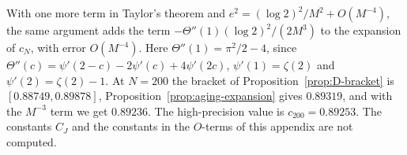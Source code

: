 With one more term in Taylor's theorem and $e^2=(\log2)^2/M^2+O(M^{-4})$, the
same argument adds the term $-\Theta''(1)(\log2)^2/(2M^3)$ to the expansion
of $c_N$, with error $O(M^{-4})$. Here $\Theta''(1)=\pi^2/2-4$, since
$\Theta''(c)=\psi'(2-c)-2\psi'(c)+4\psi'(2c)$, $\psi'(1)=\zeta(2)$ and
$\psi'(2)=\zeta(2)-1$. At $N=200$ the bracket of
Proposition~\ref{prop:D-bracket} is $[0.88749,0.89878]$,
Proposition~\ref{prop:aging-expansion} gives $0.89319$, and with the $M^{-3}$
term we get $0.89236$. The high-precision value is $c_{200}=0.89253$. The
constants $C_J$ and the constants in the $O$-terms of this appendix are not
computed.
